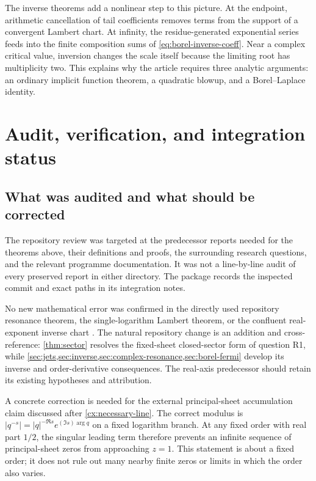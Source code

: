 \documentclass[11pt,a4paper]{article}
\numberwithin{equation}{section}
\theoremstyle{definition}
\theoremstyle{remark}
\begin{document}
The inverse theorems add a nonlinear step to this picture. At the
endpoint, arithmetic cancellation of tail coefficients removes
terms from the support of a convergent Lambert chart. At infinity,
the residue-generated exponential series feeds into the finite
composition sums of \eqref{eq:borel-inverse-coeff}. Near a complex
critical value, inversion changes the scale itself because the
limiting root has multiplicity two. This explains why the article
requires three analytic arguments: an ordinary implicit function
theorem, a quadratic blowup, and a Borel--Laplace identity.


\section{Audit, verification, and integration status}
\label{sec:validation}

\subsection{What was audited and what should be corrected}

The repository review was targeted at the predecessor reports needed
for the theorems above, their definitions and proofs, the surrounding
research questions, and the relevant programme documentation. It was
not a line-by-line audit of every preserved report in either directory.
The package records the inspected commit and exact paths in its
integration notes.

No new mathematical error was confirmed in the directly used
repository resonance theorem, the single-logarithm Lambert theorem,
or the confluent real-exponent inverse chart
\cite{repo-resonance,repo-lambert,repo-confluent}. The natural
repository change is an addition and cross-reference:
\cref{thm:sector} resolves the fixed-sheet closed-sector form of
question R1, while \cref{sec:jets,sec:inverse,sec:complex-resonance,sec:borel-fermi}
develop its inverse and order-derivative consequences. The real-axis
predecessor should retain its existing hypotheses and attribution.

A concrete correction is needed for the external principal-sheet
accumulation claim discussed after \cref{cx:necessary-line}. The
correct modulus is $|q^{-s}|=|q|^{-\Re s}
e^{(\Im s)\arg q}$ on a fixed logarithm branch. At any fixed order
with real part $1/2$, the singular leading term therefore prevents
an infinite sequence of principal-sheet zeros from approaching
$z=1$. This statement is about a fixed order; it does not rule out
many nearby finite zeros or limits in which the order also varies.
\end{document}
